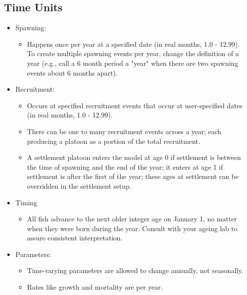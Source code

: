 \hypertarget{RecrTiming}{}
\subsection{Time Units}
	\begin{itemize}
		\item Spawning: 
		\begin{itemize}
			\item Happens once per year at a specified date (in real months, 1.0 - 12.99). To create multiple spawning events per year, change the definition of a year (e.g., call a 6 month period a "year" when there are two spawning events about 6 months apart). 
		\end{itemize}
		
		\item Recruitment:   
		\begin{itemize}
			\item Occurs at specified recruitment events that occur at user-specified dates (in real months, 1.0 - 12.99).
			\item There can be one to many recruitment events across a year; each producing a platoon as a portion of the total recruitment.
			\item A settlement platoon enters the model at age 0 if settlement is between the time of spawning and the end of the year; it enters at age 1 if settlement is after the first of the year; these ages at settlement can be overridden in the settlement setup.
		\end{itemize}
		
		\item Timing
		\begin{itemize}
			\item All fish advance to the next older integer age on January 1, no matter when they were born during the year.  Consult with your ageing lab to assure consistent interpretation.
		\end{itemize}		

		\item Parameters:
		\begin{itemize}
			\item Time-varying parameters are allowed to change annually, not seasonally.
			\item Rates like growth and mortality are per year.
		\end{itemize}
	\end{itemize}
	
